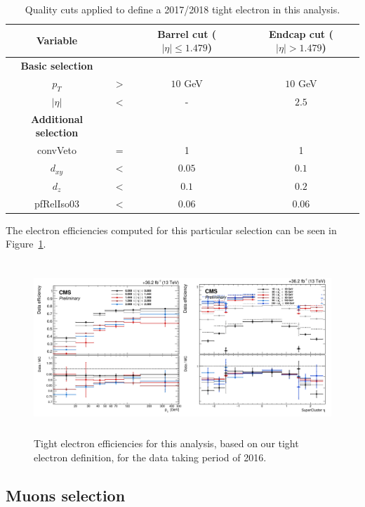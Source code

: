 \documentclass[a4paper, 10pt, openright]{report}
\begin{document}
\begin{table}
\begin{center}
\begin{tabular}{ c|c|c|c } 
 \hline
 Variable & & Barrel cut ($|\eta| \leq 1.479$) & Endcap cut ($|\eta| > 1.479$) \\
\hline
\textbf{Basic selection} & &  \\ 
$p_T$ & $>$ & $10$ GeV & $10$ GeV \\
 $|\eta|$ & $<$ & - & $2.5$ \\
 \hline
 	\textbf{Additional selection} & &  \\ 
 convVeto & $=$ & 1 & 1 \\
 $d_{xy}$ & $<$ &  $0.05$ & $0.1$ \\
 $d_z$ & $<$ & $0.1$ & $0.2$ \\
 pfRelIso03 & $<$ & $0.06$ & $0.06$ \\
\hline
\end{tabular}
\caption{Quality cuts applied to define a 2017/2018 tight electron in this analysis.}
\label{table:EleWP20178}
\end{center}
\end{table}	

The electron efficiencies computed for this particular selection can be seen in Figure~\ref{fig:EleEff}.

\begin{figure}[htbp]
\centering
\includegraphics[width=14cm, height=6.5cm]{figs/EleEff.png}
\caption{Tight electron efficiencies for this analysis, based on our tight electron definition, for the data taking period of 2016.}
\label{fig:EleEff}
\end{figure}

\subsection{Muons selection} \label{section:MuSel}
\end{document}
